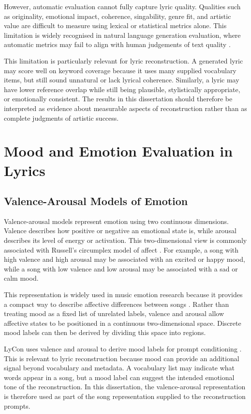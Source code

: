 However, automatic evaluation cannot fully capture lyric quality. Qualities such as originality, emotional impact, coherence, singability, genre fit, and artistic value are difficult to measure using lexical or statistical metrics alone. This limitation is widely recognised in natural language generation evaluation, where automatic metrics may fail to align with human judgements of text quality \cite{reiter2018bleu,vanDerLee2019human}.

This limitation is particularly relevant for lyric reconstruction. A generated lyric may score well on keyword coverage because it uses many supplied vocabulary items, but still sound unnatural or lack lyrical coherence. Similarly, a lyric may have lower reference overlap while still being plausible, stylistically appropriate, or emotionally consistent. The results in this dissertation should therefore be interpreted as evidence about measurable aspects of reconstruction rather than as complete judgments of artistic success.

\section{Mood and Emotion Evaluation in Lyrics}

\subsection{Valence-Arousal Models of Emotion}

Valence-arousal models represent emotion using two continuous dimensions. Valence describes how positive or negative an emotional state is, while arousal describes its level of energy or activation. This two-dimensional view is commonly associated with Russell's circumplex model of affect \cite{russell1980circumplex}. For example, a song with high valence and high arousal may be associated with an excited or happy mood, while a song with low valence and low arousal may be associated with a sad or calm mood.

This representation is widely used in music emotion research because it provides a compact way to describe affective differences between songs \cite{delbouys2018musicmood}. Rather than treating mood as a fixed list of unrelated labels, valence and arousal allow affective states to be positioned in a continuous two-dimensional space. Discrete mood labels can then be derived by dividing this space into regions.

LyCon uses valence and arousal to derive mood labels for prompt conditioning \cite{kim2024lycon}. This is relevant to lyric reconstruction because mood can provide an additional signal beyond vocabulary and metadata. A vocabulary list may indicate what words appear in a song, but a mood label can suggest the intended emotional tone of the reconstruction. In this dissertation, the valence-arousal representation is therefore used as part of the song representation supplied to the reconstruction prompts.

